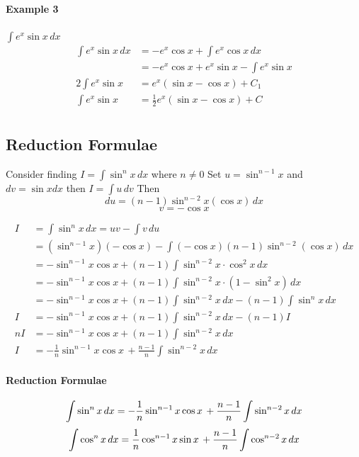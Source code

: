 \documentclass[12pt]{article}
\begin{document}
\paragraph{Example 3} $\int e^x \sin x \, dx$
\begin{align*} 
    \int e^x \sin x \, dx &= - e^x \cos x + \int e^x \cos x \, dx \\
    &= -e^x \cos x + e^x \sin x - \int e^x \sin x \\
    2 \int e^x \sin x &= e^x (\sin x - \cos x) + C_1 \\
    \int e^x \sin x &= \frac{1}{2} e^x (\sin x - \cos x) + C\\
\end{align*}

\subsection{Reduction Formulae}
Consider finding $I = \int \sin^n x \, dx$ where $n \neq 0$
Set $u = \sin^{n-1} x$ and $dv = \sin x dx$ then $I = \int u \, dv$
Then 
\[
    du = (n - 1) \sin^{n - 2} x (\cos x) \, dx 
\]
\[
    v = - \cos x
\]

\begin{align*} 
    I &= \int \sin^n x \, dx = uv - \int v \, du \\
    &= (\sin^{n - 1} x)( - \cos x) - \int ( - \cos x)(n - 1)\sin^{n - 2} (\cos x) \, dx \\
    &= - \sin^{n - 1} x \cos x + (n - 1) \int \sin^{n - 2} x \cdot \cos^2 x \, dx \\
    &= - \sin^{n - 1} x \cos x + (n - 1) \int \sin^{n - 2} x \cdot (1 - \sin^2 x)\, dx \\
    &= - \sin^{n - 1} x \cos x + (n - 1) \int \sin^{n - 2} x \, dx - (n - 1) \int \sin^{n} x \, dx \\
    I &= - \sin^{n - 1} x \cos x + (n - 1) \int \sin^{n - 2} x \, dx - (n - 1)I \\
    nI &= - \sin^{n - 1} x \cos x + (n - 1) \int \sin^{n - 2} x \, dx \\
    I &= - \frac{1}{n} \sin^{n - 1} x \cos x\, + \frac{n - 1}{n} \int \sin^{n - 2} x \, dx
\end{align*}

\paragraph{Reduction Formulae}
\[
    \int \sin^n x \, dx = - \frac{1}{n} \sin^{n - 1} x \cos x\, + \frac{n - 1}{n} \int \sin^{n - 2} x \, dx \\
\]
\[
    \int \cos^n x \, dx = \frac{1}{n}\cos^{n - 1} x  \sin x\, + \frac{n - 1}{n} \int \cos^{n - 2} x \, dx \\
\]
\end{document}
